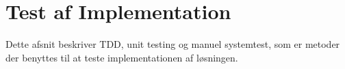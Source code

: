 \chapter{Test af Implementation}

Dette afsnit beskriver TDD, unit testing og manuel systemtest, som er metoder der benyttes til at teste implementationen af løsningen.




